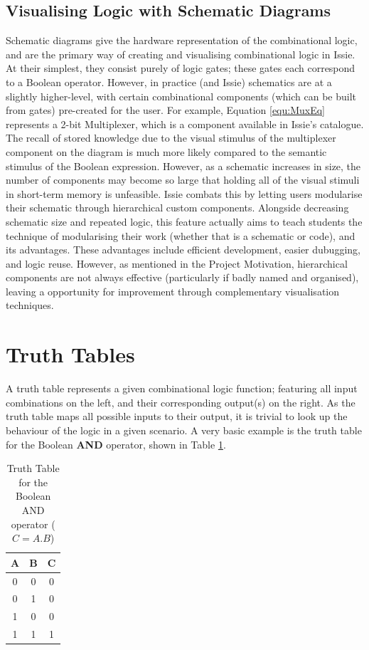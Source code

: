 \subsection{Visualising Logic with Schematic Diagrams}
Schematic diagrams give the hardware representation of the combinational logic, and are the primary way of creating and visualising combinational logic in Issie. At their simplest, they consist purely of logic gates; these gates each correspond to a Boolean operator. However, in practice (and Issie) schematics are at a slightly higher-level, with certain combinational components (which can be built from gates) pre-created for the user. For example, Equation \ref{equ:MuxEq} represents a 2-bit Multiplexer, which is a component available in Issie's catalogue. The recall of stored knowledge due to the visual stimulus of the multiplexer component on the diagram is much more likely compared to the semantic stimulus of the Boolean expression. However, as a schematic increases in size, the number of components may become so large that holding all of the visual stimuli in short-term memory is unfeasible. Issie combats this by letting users modularise their schematic through hierarchical custom components. Alongside decreasing schematic size and repeated logic, this feature actually aims to teach students the technique of modularising their work (whether that is a schematic or code), and its advantages. These advantages \cite{arm_modular} include efficient development, easier dubugging, and logic reuse. However, as mentioned in the Project Motivation, hierarchical components are not always effective (particularly if badly named and organised), leaving a opportunity for improvement through complementary visualisation techniques. 

\section{Truth Tables} \label{subsec:TruthTables}
A truth table represents a given combinational logic function; featuring all input combinations on the left, and their corresponding output(s) on the right. As the truth table maps all possible inputs to their output, it is trivial to look up the behaviour of the logic in a given scenario. A very basic example is the truth table for the Boolean \textbf{AND} operator, shown in Table \ref{tab:And_TT}.

\begin{table}[h!]
    \centering
    \begin{tabular}{c|c||c}
     \textbf{A} & \textbf{B} & \textbf{C} \\
     \hline
     0 & 0 & 0  \\
     0 & 1 & 0  \\
     1 & 0 & 0  \\
     1 & 1 & 1
    \end{tabular}
    \caption{Truth Table for the Boolean AND operator ($C = A.B$)}
    \label{tab:And_TT}
\end{table}

